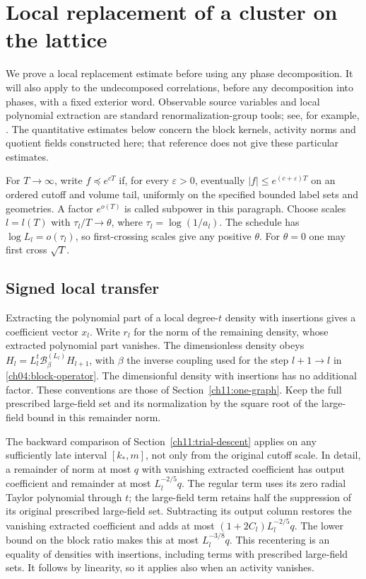 \section{Local replacement of a cluster on the lattice}
\label{ch18:lattice-products}

We prove a local replacement estimate before using any phase decomposition.
It will also apply to the undecomposed correlations, before any decomposition into phases, with a fixed exterior word.
Observable source variables and local polynomial extraction are standard
renormalization-group tools; see, for example,
\cite{BauerschmidtBrydgesSlade2015}. The quantitative estimates below concern
the block kernels, activity norms and quotient fields constructed
here; that reference does not give these particular estimates.

For $T\to\infty$, write $f\preccurlyeq e^{cT}$ if, for every
$\varepsilon>0$, eventually $|f|\le e^{(c+\varepsilon)T}$ on an ordered
cutoff and volume tail, uniformly on the specified bounded label sets
and geometries. A factor $e^{o(T)}$ is called subpower in this paragraph.
Choose scales $l=l(T)$ with $\tau_l/T\to\theta$, where
$\tau_l=\log(1/a_l)$. The schedule has $\log L_l=o(\tau_l)$, so
first-crossing scales give any positive $\theta$. For $\theta=0$ one may
first cross $\sqrt T$.

\subsection{Signed local transfer}

Extracting the polynomial part of a local degree-$t$ density with insertions
gives a coefficient vector $x_l$. Write $r_l$ for the norm of the
remaining density, whose extracted polynomial part vanishes. The dimensionless density obeys
$H_l=L_l^t\mathcal B^{(L_l)}_\beta H_{l+1}$, with $\beta$ the inverse coupling used for the step $l+1\to l$ in \eqref{ch04:block-operator}. The dimensionful density with insertions has
no additional factor. These conventions are those of
Section~\ref{ch11:one-graph}. Keep the full prescribed large-field set and
its normalization by the square root of the large-field bound in this remainder norm.

The backward comparison of Section~\ref{ch11:trial-descent} applies
on any sufficiently late interval $[k_*,m]$, not only from the original
cutoff scale. In detail, a remainder of norm at most $q$ with vanishing extracted coefficient has
output coefficient and remainder at most $L_l^{-2/5}q$.
The regular term uses its zero radial Taylor polynomial through $t$;
the large-field term retains half the suppression of its original
prescribed large-field set. Subtracting its output column restores the vanishing extracted coefficient and
adds at most $(1+2C_l)L_l^{-2/5}q$. The lower bound on the block ratio makes this at
most $L_l^{-3/8}q$. This recentering is an equality of
densities with insertions, including terms with prescribed large-field sets. It follows by
linearity, so it applies also when an activity vanishes.

